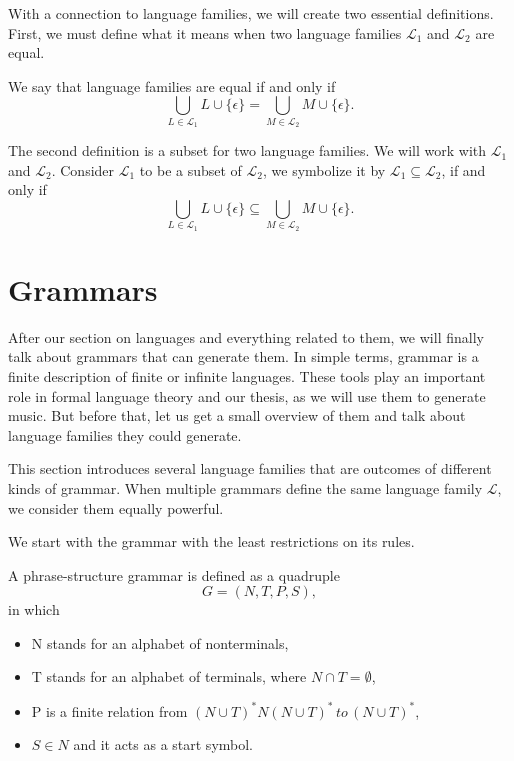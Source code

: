 With a connection to language families, we will create two essential definitions. First, we must define what it means when two language families $\mathcal{L}_1$ and $\mathcal{L}_2$ are equal.

\begin{definition}
\label{Def12}
We say that language families are equal if and only if $$\bigcup_{L \in \mathcal{L}_1} L \cup \{\epsilon\} = \bigcup_{M \in \mathcal{L}_2} M \cup \{\epsilon\}.$$
\end{definition}

The second definition is a subset for two language families. We will work with $\mathcal{L}_1$ and $\mathcal{L}_2$. Consider $\mathcal{L}_1$ to be a subset of $\mathcal{L}_2$, we symbolize it by $\mathcal{L}_1 \subseteq \mathcal{L}_2$, if and only if 
$$\bigcup_{L \in \mathcal{L}_1} L \cup \{\epsilon\} \subseteq \bigcup_{M \in \mathcal{L}_2} M \cup \{\epsilon\}.$$

\section{Grammars}
After our section on languages and everything related to them, we will finally talk about grammars that can generate them. In simple terms, grammar is a finite description of finite or infinite languages. These tools play an important role in formal language theory and our thesis, as we will use them to generate music. But before that, let us get a small overview of them and talk about language families they could generate.

This section introduces several language families that are outcomes of different kinds of grammar. When multiple grammars define the same language family $\mathcal{L}$, we consider them equally powerful.

We start with the grammar with the least restrictions on its rules.
\begin{definition}
\label{Def13}
A phrase-structure grammar is defined as a quadruple 
$$G = (N, T, P, S),$$ in which
\begin{itemize}
    \item{N stands for an alphabet of nonterminals,}
    \item{T stands for an alphabet of terminals, where $N \cap T = \emptyset$,}
    \item{P is a finite relation from $(N \cup T)^*N(N \cup T)^* \, to \, (N \cup T)^*$,}
    \item{$S \in N$ and it acts as a start symbol.}
\end{itemize}
\end{definition}

